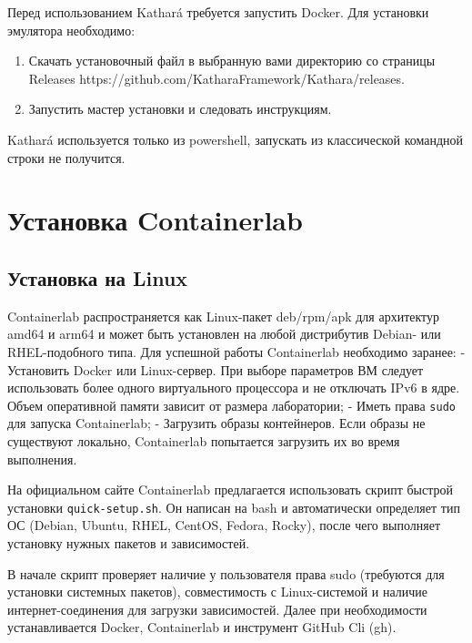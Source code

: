 \documentclass[
  english,
  russian,
  12pt,
  a4paper,
]{phdthesr}
\providecommand{\tightlist}{%
  \setlength{\itemsep}{0pt}\setlength{\parskip}{0pt}}
\begin{document}
Перед использованием Kathará требуется запустить Docker. Для установки
эмулятора необходимо:

\begin{enumerate}
\def\labelenumi{\arabic{enumi}.}
\tightlist
\item
  Скачать установочный файл в выбранную вами директорию со страницы
  Releases https://github.com/KatharaFramework/Kathara/releases.
\item
  Запустить мастер установки и следовать инструкциям.
\end{enumerate}

Kathará используется только из powershell, запускать из классической
командной строки не получится.

\section{Установка
Containerlab}\label{ux443ux441ux442ux430ux43dux43eux432ux43aux430-containerlab}

\subsection{Установка на
Linux}\label{ux443ux441ux442ux430ux43dux43eux432ux43aux430-ux43dux430-linux-1}

Containerlab распространяется как Linux-пакет deb/rpm/apk для архитектур
amd64 и arm64 и может быть установлен на любой дистрибутив Debian- или
RHEL-подобного типа. Для успешной работы Containerlab необходимо
заранее: - Установить Docker или Linux-сервер. При выборе параметров ВМ
следует использовать более одного виртуального процессора и не отключать
IPv6 в ядре. Объем оперативной памяти зависит от размера лаборатории; -
Иметь права \texttt{sudo} для запуска Containerlab; - Загрузить образы
контейнеров. Если образы не существуют локально, Containerlab попытается
загрузить их во время выполнения.

На официальном сайте Containerlab предлагается использовать скрипт
быстрой установки \texttt{quick-setup.sh}. Он написан на bash и
автоматически определяет тип ОС (Debian, Ubuntu, RHEL, CentOS, Fedora,
Rocky), после чего выполняет установку нужных пакетов и зависимостей.

В начале скрипт проверяет наличие у пользователя права sudo (требуются
для установки системных пакетов), совместимость с Linux-системой и
наличие интернет-соединения для загрузки зависимостей. Далее при
необходимости устанавливается Docker, Containerlab и инструмент GitHub
Cli (gh).
\end{document}
